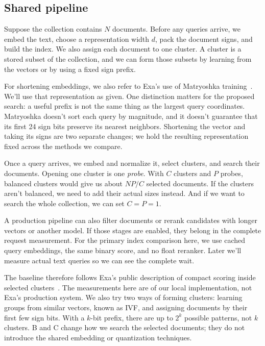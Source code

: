 \subsection{Shared pipeline}
Suppose the collection contains $N$ documents. Before any queries arrive, we embed the text,
choose a representation width $d$, pack the document signs, and build the index. We also assign
each document to one cluster. A cluster is a stored subset of the collection, and we can form
those subsets by learning from the vectors or by using a fixed sign prefix.

For shortening embeddings, we also refer to Exa's use of Matryoshka training~\cite{exa,mrl}.
We'll use that representation as given. One distinction matters for the proposed search:
a useful prefix is not the same thing as the largest query coordinates. Matryoshka doesn't
sort each query by magnitude, and it doesn't guarantee that its first 24 sign bits preserve
its nearest neighbors. Shortening the vector and taking its signs are two separate changes;
we hold the resulting representation fixed across the methods we compare.

Once a query arrives, we embed and normalize it, select clusters, and search their documents.
Opening one cluster is one \emph{probe}. With $C$ clusters and $P$ probes, balanced clusters
would give us about $NP/C$ selected documents. If the clusters aren't balanced, we need to
add their actual sizes instead. And if we want to search the whole collection, we can set
$C=P=1$.


A production pipeline can also filter documents or rerank candidates with longer vectors or
another model. If those stages are enabled, they belong in the complete request measurement.
For the primary index comparison here, we use cached query embeddings, the same binary score,
and no float reranker. Later we'll measure actual text queries so we can see the complete wait.

The baseline therefore follows Exa's public description of compact scoring inside selected
clusters~\cite{exa}. The measurements here are of our local implementation, not Exa's production
system. We also try two ways of forming clusters: learning groups from similar vectors,
known as IVF, and assigning documents by their first few sign bits. With a $k$-bit prefix,
there are up to $2^k$ possible patterns, not $k$ clusters. B and C change how we search the
selected documents; they do not introduce the shared embedding or quantization techniques.